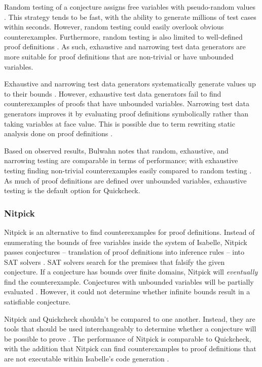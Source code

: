 Random testing of a conjecture assigns free variables with pseudo-random values \cite[Sec. 3.1]{isabelleQuickcheck}. This strategy tends to be fast, 
with the ability to generate millions of test cases within seconds. However, random testing could easily overlook obvious counterexamples. 
Furthermore, random testing is also limited to well-defined proof definitions \cite{isabelleQuickcheck}. As such, exhaustive and narrowing 
test data generators are more suitable for proof definitions that are non-trivial or have unbounded variables.

Exhaustive and narrowing test data generators systematically generate values up to their bounds \cite{isabelleQuickcheck}. 
However, exhaustive test data generators fail to find counterexamples of proofs that have unbounded variables. Narrowing test data generators 
improves it by evaluating proof definitions symbolically rather than taking variables at face value. This is possible due to 
term rewriting static analysis done on proof definitions \cite[Sec. 5]{isabelleQuickcheck}.

Based on observed results, Bulwahn notes that random, exhaustive, and narrowing testing are comparable in terms of performance; with 
exhaustive testing finding non-trivial counterexamples easily compared to random testing \cite[Sec. 7]{isabelleQuickcheck}. As much of  
proof definitions are defined over unbounded variables, exhaustive testing is the default option for Quickcheck.

\subsubsection{Nitpick}
\label{sec:Nitpick}

Nitpick is an alternative to find counterexamples for proof definitions. Instead of enumerating the bounds of free variables inside the 
system of Isabelle, Nitpick passes conjectures -- translation of proof definitions into inference rules -- into SAT solvers 
\cite[Sec. 5]{isabelleProof}. SAT solvers search for the premises that falsify the given conjecture. If a conjecture 
has bounds over finite domains, Nitpick will \emph{eventually} find the counterexample. Conjectures with unbounded variables will be partially 
evaluated \cite[Sec. 5.2]{isabelleProof}. However, it could not determine whether infinite bounds result in a satisfiable conjecture.

Nitpick and Quickcheck shouldn't be compared to one another. Instead, they are tools that should be used interchangeably to determine 
whether a conjecture will be possible to prove \cite{isabelleQuickcheck}. The performance of Nitpick is comparable to Quickcheck, with 
the addition that Nitpick can find counterexamples to proof definitions that are not executable within Isabelle's code generation 
\cite[Sec. 7]{isabelleQuickcheck}.

